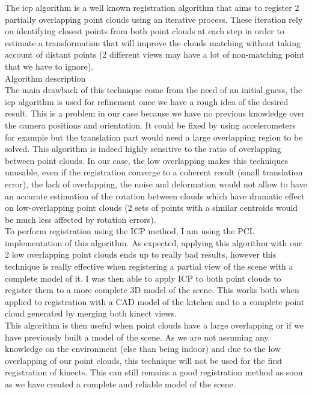 The \acrlong{icp} algorithm is a well known registration algorithm that aims to register 2 partially overlapping point clouds using an iterative process. These iteration rely on identifying closest points from both point clouds at each step in order to estimate a transformation that will improve the clouds matching without taking account of distant points (2 different views may have a lot of non-matching point that we have to ignore). \\
Algorithm description \\
The main drawback of this technique come from the need of an initial guess, the \acrshort{icp} algorithm is used for refinement once we have a rough idea of the desired result. This is a problem in our case because we have no previous knowledge over the camera positions and orientation. It could be fixed by using accelerometers for example but the translation part would need a large overlapping region to be solved. This algorithm is indeed highly sensitive to the ratio of overlapping between point clouds. In our case, the low overlapping makes this techniques unusable, even if the registration converge to a coherent result (small translation error), the lack of overlapping, the noise and deformation would not allow to have an accurate estimation of the rotation between clouds which have dramatic effect on low-overlapping point clouds (2 sets of points with a similar centroids would be much less affected by rotation errors). \\
To perform registration using the ICP method, I am using the PCL implementation of this algorithm. As expected, applying this algorithm with our 2 low overlapping point clouds ends up to really bad results, however this technique is really effective when registering a partial view of the scene with a complete model of it. I was then able to apply ICP to both point clouds to register them to a more complete 3D model of the scene. This works both when applied to registration with a CAD model of the kitchen and to a complete point cloud generated by merging both kinect views. \\
This algorithm is then useful when point clouds have a large overlapping or if we have previously built a model of the scene. As we are not assuming any knowledge on the environment (else than being indoor) and due to the low overlapping of our point clouds, this technique will not be used for the first registration of kinects. This can still remains a good registration method as soon as we have created a complete and reliable model of the scene.

